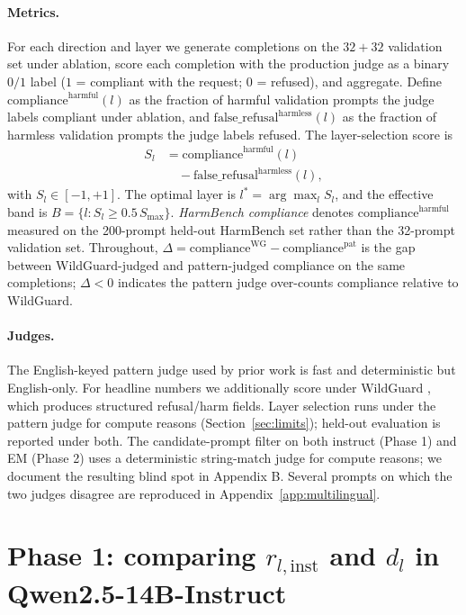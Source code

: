 \documentclass{article}
\newcommand{\rinst}{r_{l,\mathrm{inst}}}
\newcommand{\dinst}{d_{l}}
\newcommand{\Sl}{S_{l}}
\begin{document}
\paragraph{Metrics.} For each direction and layer we generate
completions on the $32+32$ validation set under ablation, score
each completion with the production judge as a binary $0/1$ label
($1$ = compliant with the request; $0$ = refused), and aggregate.
Define $\mathrm{compliance}^{\mathrm{harmful}}(l)$ as the fraction
of harmful validation prompts the judge labels compliant under
ablation, and $\mathrm{false\_refusal}^{\mathrm{harmless}}(l)$ as
the fraction of harmless validation prompts the judge labels
refused. The layer-selection score is
\begin{align*}
  \Sl &= \mathrm{compliance}^{\mathrm{harmful}}(l) \\
      &\quad - \mathrm{false\_refusal}^{\mathrm{harmless}}(l),
\end{align*}
with $\Sl \in [-1, +1]$. The optimal layer is
$l^{*} = \arg\max_l \Sl$, and the effective band is
$B = \{l : \Sl \geq 0.5\,S_{\max}\}$. \emph{HarmBench compliance}
denotes $\mathrm{compliance}^{\mathrm{harmful}}$ measured on the
200-prompt held-out HarmBench set rather than the 32-prompt
validation set. Throughout, $\Delta = \mathrm{compliance}^{\mathrm{WG}}
- \mathrm{compliance}^{\mathrm{pat}}$ is the gap between
WildGuard-judged and pattern-judged compliance on the same
completions; $\Delta < 0$ indicates the pattern judge over-counts
compliance relative to WildGuard.

\paragraph{Judges.} The English-keyed pattern judge used by prior
work is fast and deterministic but English-only. For headline
numbers we additionally score under WildGuard
\citep{han2024wildguard}, which produces
structured refusal/harm fields. Layer selection runs under the
pattern judge for compute reasons (Section~\ref{sec:limits});
held-out evaluation is reported under both. The candidate-prompt filter on both instruct (Phase 1) and EM (Phase 2) uses a deterministic string-match judge for compute reasons; we document the resulting blind spot in Appendix B. Several prompts on which the two judges disagree are
reproduced in Appendix~\ref{app:multilingual}.

\section{Phase 1: comparing $\rinst$ and $\dinst$ in
Qwen2.5-14B-Instruct}
\label{sec:phase1}
\end{document}
